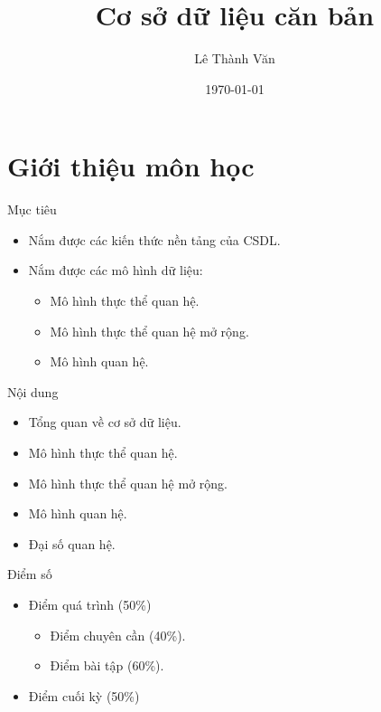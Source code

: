 \documentclass[11pt]{beamer}
\author{Lê Thành Văn}
\title{Cơ sở dữ liệu căn bản}
\institute{Khoa Hệ thống thông tin quản lý}
\date{\today}
\begin{document}
    \begin{frame}
        \titlepage
    \end{frame}

    \section{Giới thiệu môn học}
    \begin{frame}{Mục tiêu}
        \begin{itemize}
            \item Nắm được các kiến thức nền tảng của CSDL.
            \item Nắm được các mô hình dữ liệu:
            \begin{itemize}
                \item Mô hình thực thể quan hệ.
                \item Mô hình thực thể quan hệ mở rộng.
                \item Mô hình quan hệ.
            \end{itemize}
        \end{itemize}
    \end{frame}

    \begin{frame}{Nội dung}
        \begin{itemize}
            \item Tổng quan về cơ sở dữ liệu.
            \item Mô hình thực thể quan hệ.
            \item Mô hình thực thể quan hệ mở rộng.
            \item Mô hình quan hệ.
            \item Đại số quan hệ.
        \end{itemize}
    \end{frame}

    \begin{frame}{Điểm số}
        \begin{itemize}
            \item Điểm quá trình (50\%)
            \begin{itemize}
                \item Điểm chuyên cần (40\%).
                \item Điểm bài tập (60\%).
            \end{itemize}
            \item Điểm cuối kỳ (50\%)
        \end{itemize}
    \end{frame}
\end{document}
